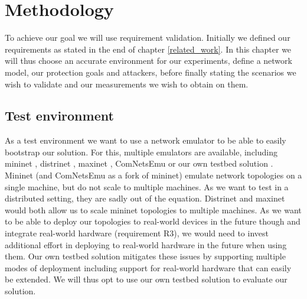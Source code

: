 \chapter{Methodology}
\iffalse
\begin{itemize}
    \item Requirement validation as base methodology
    \item Test environment (Discussion Mininet vs Distrinet vs our solution)
    \item Protection goals (including metrics like bandwidth and latency)
    \begin{itemize}
        \item Questions that can be validated in chapter “Validation” => Protection goal list
    \end{itemize}
    \item Attackers
    \item Deployments
    \begin{itemize}
        \item Full local deployment
        \item Minimal distributed deployment (2 Hosts, 1 real-world SDN Switch)
    \end{itemize}
\end{itemize}
\fi
To achieve our goal we will use requirement validation. Initially we defined our requirements as stated in the end of chapter \ref{related_work}. In this chapter we will thus choose an accurate environment for our experiments, define a network model, our protection goals and attackers, before finally stating the scenarios we wish to validate and our measurements we wish to obtain on them.

\section{Test environment}
As a test environment we want to use a network emulator to be able to easily bootstrap our solution. For this, multiple emulators are available, including mininet \cite{mininet}, distrinet \cite{distrinet1, distrinet2}, maxinet \cite{maxinet}, ComNetsEmu \cite{comnetsemu} or our own testbed solution \cite{owntb}.
Mininet (and ComNetsEmu as a fork of mininet) emulate network topologies on a single machine, but do not scale to multiple machines. As we want to test in a distributed setting, they are sadly out of the equation. Distrinet and maxinet would both allow us to scale mininet topologies to multiple machines. As we want to be able to deploy our topologies to real-world devices in the future though and integrate real-world hardware (requirement R3), we would need to invest additional effort in deploying to real-world hardware in the future when using them. Our own testbed solution mitigates these issues by supporting multiple modes of deployment including support for real-world hardware that can easily be extended. We will thus opt to use our own testbed solution to evaluate our solution.


